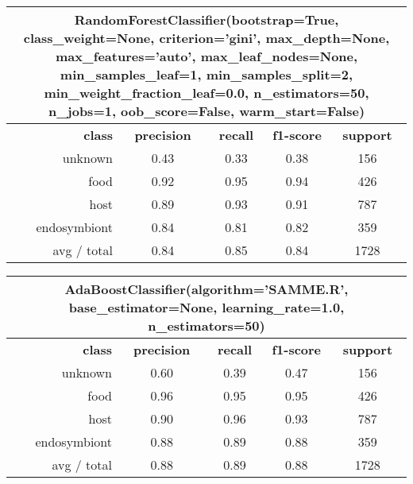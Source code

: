 \begin{table}
	\begin{tabular}{|r|c|c|c|c|}
		\hline
		\multicolumn{5}{c}{RandomForestClassifier(bootstrap=True, class\_weight=None, criterion='gini', max\_depth=None, max\_features='auto', max\_leaf\_nodes=None, min\_samples\_leaf=1, min\_samples\_split=2, min\_weight\_fraction\_leaf=0.0, n\_estimators=50, n\_jobs=1, oob\_score=False, warm\_start=False)}\\
		\hline
		\textbf{class}		& \textbf{precision}  &  \textbf{recall}  & \textbf{f1-score}  &  \textbf{support} \\
		unknown   	&    0.43 	 &   0.33   &    0.38   &   156   \\
		food      	&    0.92 	 &   0.95   &    0.94   &   426   \\
		host      	&    0.89    &   0.93   &    0.91   &   787   \\
		endosymbiont&    0.84    &   0.81   &    0.82   &   359   \\
		\hline
		avg / total &    0.84    &   0.85   &    0.84   &   1728  \\
		\hline
	\end{tabular}
\end{table}




\begin{table}
	\begin{tabular}{|r|c|c|c|c|}
		\hline
		\multicolumn{5}{c}{AdaBoostClassifier(algorithm='SAMME.R', base\_estimator=None, learning\_rate=1.0, n\_estimators=50)}\\
		\hline
		\textbf{class}		& \textbf{precision}  &  \textbf{recall}  & \textbf{f1-score}  &  \textbf{support} \\
		unknown   	&    0.60 	 &   0.39   &    0.47   &   156   \\
		food      	&    0.96 	 &   0.95   &    0.95   &   426   \\
		host      	&    0.90    &   0.96   &    0.93   &   787   \\
		endosymbiont&    0.88    &   0.89   &    0.88   &   359   \\
		\hline
		avg / total &    0.88    &   0.89   &    0.88   &   1728  \\
		\hline
	\end{tabular}
\end{table}



